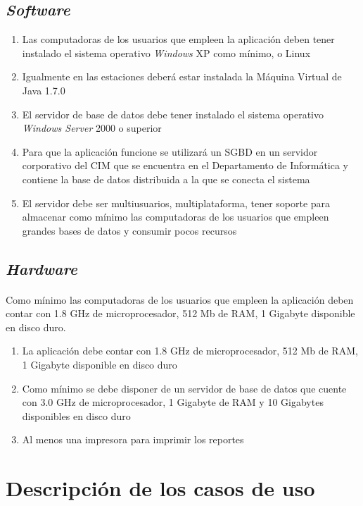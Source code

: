 \subsection{\textit{Software}}
\begin{enumerate}
	\item Las computadoras de los usuarios que empleen la aplicación deben tener instalado el sistema operativo \textit{Windows} XP como mínimo, o Linux
	\item Igualmente en las estaciones deberá estar instalada la Máquina Virtual de Java 1.7.0
	\item El servidor de base de datos debe tener instalado el sistema operativo \textit{Windows Server} 2000 o superior
	\item Para que la aplicación funcione se utilizará un SGBD en un servidor	corporativo del CIM que se encuentra en el Departamento de Informática y	contiene la base de datos distribuida a la que se conecta el sistema
	\item El servidor debe ser multiusuarios, multiplataforma, tener soporte para almacenar como mínimo las computadoras de los usuarios que empleen grandes bases de datos y consumir pocos recursos
\end{enumerate}
\subsection{\textit{Hardware}}
\paragraph{}Como mínimo las computadoras de los usuarios que empleen la aplicación deben contar con 1.8 GHz de microprocesador, 512 Mb de RAM, 1 Gigabyte disponible en disco duro.
\begin{enumerate}
	\item La aplicación debe contar con 1.8 GHz de microprocesador, 512 Mb de RAM, 1 Gigabyte disponible en disco duro
	\item Como mínimo se debe disponer de un servidor de base de datos que cuente con 3.0 GHz de microprocesador, 1 Gigabyte de RAM y 10 Gigabytes disponibles en disco duro
	\item Al menos una impresora para imprimir los reportes
\end{enumerate}

\section{Descripción de los casos de uso}
